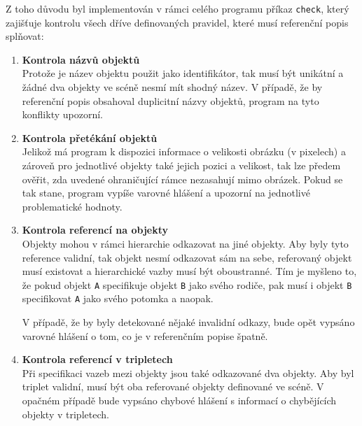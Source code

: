 Z toho důvodu byl implementován v rámci celého programu příkaz \texttt{check}, který zajišťuje kontrolu všech dříve definovaných pravidel, které musí referenční popis splňovat:
\begin{enumerate}
	\item \textbf{Kontrola názvů objektů}\\
	      Protože je název objektu použit jako identifikátor, tak musí být unikátní a žádné dva objekty ve scéně nesmí mít shodný název.
	      V případě, že by referenční popis obsahoval duplicitní názvy objektů, program na tyto konflikty upozorní.
	\item \textbf{Kontrola přetékání objektů}\\
	      Jelikož má program k dispozici informace o velikosti obrázku (v pixelech) a zároveň pro jednotlivé objekty také jejich pozici a velikost,
	      tak lze předem ověřit, zda uvedené ohraničující rámce nezasahují mimo obrázek.
	      Pokud se tak stane, program vypíše varovné hlášení a upozorní na jednotlivé problematické hodnoty.
	\item \textbf{Kontrola referencí na objekty}\\
	      Objekty mohou v rámci hierarchie odkazovat na jiné objekty.
	      Aby byly tyto reference validní, tak objekt nesmí odkazovat sám na sebe, referovaný objekt musí existovat a hierarchické vazby musí být oboustranné.
	      Tím je myšleno to, že pokud objekt \texttt{\color{red!80!black}A} specifikuje objekt \texttt{\color{red!80!black}B} jako svého rodiče,
	      pak musí i objekt \texttt{\color{red!80!black}B} specifikovat \texttt{\color{red!80!black}A} jako svého potomka a naopak.

	      V případě, že by byly detekované nějaké invalidní odkazy, bude opět vypsáno varovné hlášení o tom, co je v referenčním popise špatně.
	\item \textbf{Kontrola referencí v tripletech}\\
	      Při specifikaci vazeb mezi objekty jsou také odkazované dva objekty.
	      Aby byl triplet validní, musí být oba referované objekty definované ve scéně.
	      V opačném případě bude vypsáno chybové hlášení s informací o chybějících objekty v tripletech.
\end{enumerate}

